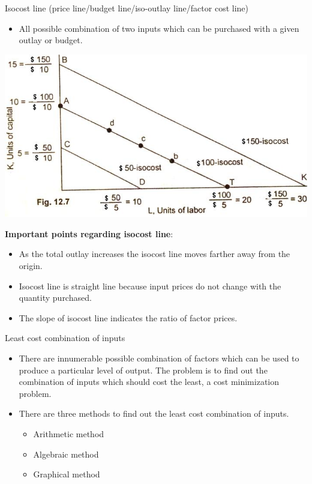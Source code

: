 \documentclass[12pt,ignorenonframetext,aspectratio=169]{beamer}
\providecommand{\tightlist}{%
  \setlength{\itemsep}{0pt}\setlength{\parskip}{0pt}}
\begin{document}
\begin{frame}{Isocost line (price line/budget line/iso-outlay
line/factor cost line)}
\protect\hypertarget{isocost-line-price-linebudget-lineiso-outlay-linefactor-cost-line}{}
\begin{itemize}
\tightlist
\item
  All possible combination of two inputs which can be purchased with a
  given outlay or budget.
\end{itemize}

\includegraphics[width=0.45\linewidth]{./figs/isocost-line-budget-outlay-shift}
\end{frame}

\begin{frame}{}
\protect\hypertarget{section-8}{}
\textbf{Important points regarding isocost line}:

\begin{itemize}
\tightlist
\item
  As the total outlay increases the isocost line moves farther away from
  the origin.
\item
  Isocost line is straight line because input prices do not change with
  the quantity purchased.
\item
  The slope of isocost line indicates the ratio of factor prices.
\end{itemize}
\end{frame}

\begin{frame}{Least cost combination of inputs}
\protect\hypertarget{least-cost-combination-of-inputs}{}
\begin{itemize}
\tightlist
\item
  There are innumerable possible combination of factors which can be
  used to produce a particular level of output. The problem is to find
  out the combination of inputs which should cost the least, a cost
  minimization problem.
\item
  There are three methods to find out the least cost combination of
  inputs.

  \begin{itemize}
  \tightlist
  \item
    Arithmetic method
  \item
    Algebraic method
  \item
    Graphical method
  \end{itemize}
\end{itemize}
\end{frame}
\end{document}
